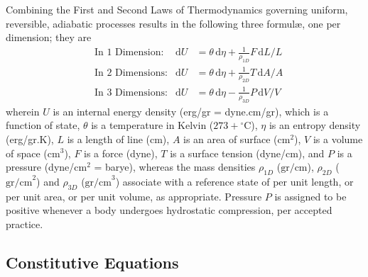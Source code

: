 Combining the First and Second Laws of Thermo\-dynamics governing uniform, reversible, adiabatic processes results in the following three formul\ae, one per dimension; they are
\begin{subequations}
    \label{thermoelasticLaws}
    \begin{align}
    \mbox{} & \text{In 1 Dimension:} & 
    \mathrm{d}U & = \theta \, \mathrm{d} \eta +
    \tfrac{1}{\rho_{1D}} F \, \mathrm{d}L / L
    \label{thermoelastic1Dlaw} \\
    \mbox{} & \text{In 2 Dimensions:} &
    \mathrm{d}U & = \theta \, \mathrm{d} \eta + 
    \tfrac{1}{\rho_{2D}} T \, \mathrm{d}A / \! A
    \label{thermoelastic2Dlaw} \\
    \mbox{} & \text{In 3 Dimensions:} &
    \mathrm{d}U & = \theta \, \mathrm{d} \eta - 
    \tfrac{1}{\rho_{3D}} P \, \mathrm{d}V \! / V \!
    \label{thermoelastic3Dlaw}
    \end{align}
\end{subequations}
wherein $U$ is an internal energy density (erg/gr = dyne.cm/gr), which is a function of state, $\theta$ is a temperature in Kelvin ($273 + \mbox{}^{\circ}$C), $\eta$ is an entropy density (erg/gr.K), $L$ is a length of line (cm), $A$ is an area of surface ($\text{cm}^2$), $V$ is a volume of space ($\text{cm}^3$), $F$ is a force (dyne), $T$ is a surface tension (dyne/cm), and $P$ is a pressure (dyne/$\text{cm}^2$ = barye), whereas the mass densities $\rho_{1D}$ ($\text{gr/cm}$), $\rho_{2D}$ ($\text{gr/cm}^2$) and $\rho_{3D}$ ($\text{gr/cm}^3$) associate with a reference state of per unit length, or per unit area, or per unit volume, as appropriate.  Pressure $P$ is assigned to be positive whenever a body undergoes hydro\-static compression, per accepted practice.

\subsection{Constitutive Equations}

